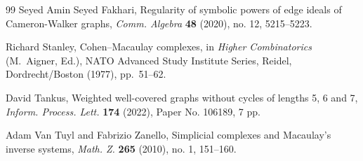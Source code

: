 \documentclass[12pt]{amsart}
\numberwithin{equation}{section}
\theoremstyle{definition}
\newcounter{i} %
\begin{document}
\begin{thebibliography}{99}
Seyed Amin Seyed Fakhari, 
Regularity of symbolic powers of edge ideals of Cameron-Walker graphs,
{\it Comm. Algebra} {\bf 48} (2020), no. 12, 5215--5223.

Richard Stanley, Cohen--Macaulay complexes, in 
{\it Higher Combinatorics} (M.~Aigner, Ed.), NATO Advanced Study Institute Series, Reidel, Dordrecht/Boston (1977), pp.~51--62.

David Tankus, 
Weighted well-covered graphs without cycles of lengths 5, 6 and 7,
{\it Inform. Process. Lett.} {\bf 174} (2022), Paper No. 106189, 7 pp.

 Adam Van Tuyl and Fabrizio Zanello, 
Simplicial complexes and Macaulay's inverse systems,
{\it Math. Z.} {\bf 265} (2010), no. 1, 151--160.

\end{thebibliography}
\end{document}
